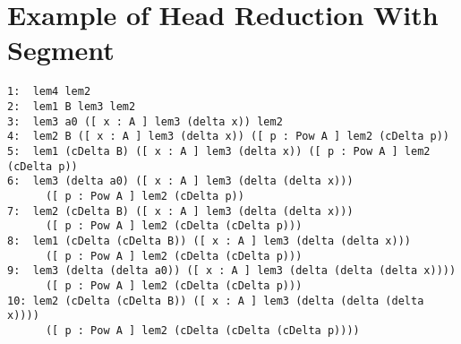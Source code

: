 \section{Example of Head Reduction With Segment}\label{apdix:hred:extend}
\begin{Verbatim}[fontsize=\small]
1:  lem4 lem2
2:  lem1 B lem3 lem2
3:  lem3 a0 ([ x : A ] lem3 (delta x)) lem2
4:  lem2 B ([ x : A ] lem3 (delta x)) ([ p : Pow A ] lem2 (cDelta p))
5:  lem1 (cDelta B) ([ x : A ] lem3 (delta x)) ([ p : Pow A ] lem2 (cDelta p))
6:  lem3 (delta a0) ([ x : A ] lem3 (delta (delta x)))
      ([ p : Pow A ] lem2 (cDelta p))
7:  lem2 (cDelta B) ([ x : A ] lem3 (delta (delta x)))
      ([ p : Pow A ] lem2 (cDelta (cDelta p)))
8:  lem1 (cDelta (cDelta B)) ([ x : A ] lem3 (delta (delta x)))
      ([ p : Pow A ] lem2 (cDelta (cDelta p)))
9:  lem3 (delta (delta a0)) ([ x : A ] lem3 (delta (delta (delta x))))
      ([ p : Pow A ] lem2 (cDelta (cDelta p)))
10: lem2 (cDelta (cDelta B)) ([ x : A ] lem3 (delta (delta (delta x))))
      ([ p : Pow A ] lem2 (cDelta (cDelta (cDelta p))))    
\end{Verbatim}

